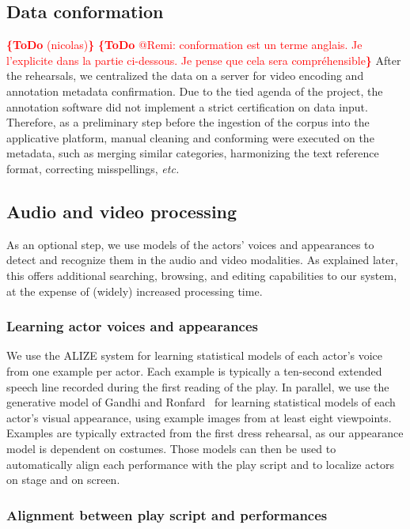 \documentclass[conference]{IEEEtran}
\newcommand{\todo}[1]{\noindent\textcolor{red}{{\bf \{ToDo} #1{\bf \}}}}
\begin{document}
\subsection{Data conformation}

\todo{(nicolas)}
\todo{@Remi: conformation est un terme anglais. Je l'explicite dans la partie ci-dessous. Je pense que cela sera compréhensible}
After the rehearsals, we centralized the data on a server for video encoding and annotation metadata confirmation. Due to the tied agenda of the project, the annotation software did not implement a strict certification on data input. Therefore, as a preliminary step before the ingestion of the corpus into the applicative platform, manual cleaning and conforming were executed on the metadata, such as merging similar categories, harmonizing the text reference format, correcting misspellings, \emph{etc.}

\subsection{Audio and video processing}
As an optional step, we use models of the actors' voices and appearances to detect and recognize them in the audio and video modalities. As explained later, this offers additional searching, browsing, and editing capabilities to our system, at the expense of (widely) increased processing time.

\subsubsection{Learning actor voices and appearances}
We use the ALIZE system for learning statistical models of each actor's voice~\cite{Bonastre05}  from one example per actor.
Each example is typically a ten-second extended speech line recorded during the first reading of the play. In parallel, we use the generative model of Gandhi and Ronfard~\cite{Gandhi13} for learning statistical models of each actor's visual appearance, using example images from at least eight viewpoints. Examples are typically extracted from the first dress rehearsal, as our appearance model is dependent on costumes.  Those models can then be used to automatically align each performance with the play script and to localize actors on stage and on screen. 

\subsubsection{Alignment between play script and performances}
\end{document}
